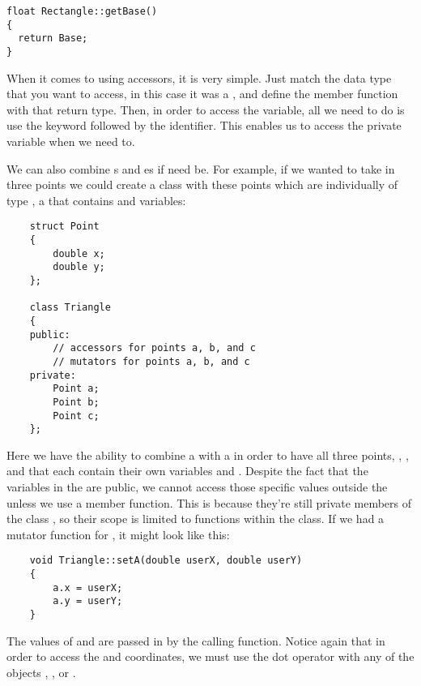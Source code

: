 \begin{lstlisting}
float Rectangle::getBase()
{
  return Base;
}
\end{lstlisting}

When it comes to using accessors, it is very simple. 
Just match the data type that you want to access, in this case it was a , and define the member function with that return type. 
Then, in order to access the variable, all we need to do is use the keyword  followed by the identifier. 
This enables us to access the private variable when we need to. 


We can also combine s and es if need be. 
For example, if we wanted to take in three points we could create a  class with these points which are individually of type , a  that contains  and  variables:

\begin{lstlisting}
	struct Point
	{
		double x;
		double y;
	};
	
	class Triangle
	{
	public:
		// accessors for points a, b, and c
		// mutators for points a, b, and c
	private:
		Point a;
		Point b;
		Point c;
	};
\end{lstlisting}

Here we have the ability to combine a  with a  in order to have all three points, , , and  that each contain their own variables  and .
Despite the fact that the variables in the  are public, we cannot access those specific values outside the  unless we use a member function. 
This is because they're still private members of the class , so their scope is limited to functions within the class. 
If we had a mutator function for , it might look like this:

\begin{lstlisting}
	void Triangle::setA(double userX, double userY)
	{
		a.x = userX;
		a.y = userY;
	}
\end{lstlisting}

The values of  and  are passed in by the calling function. 
Notice again that in order to access the  and  coordinates, we must use the dot operator with any of the  objects , , or .


